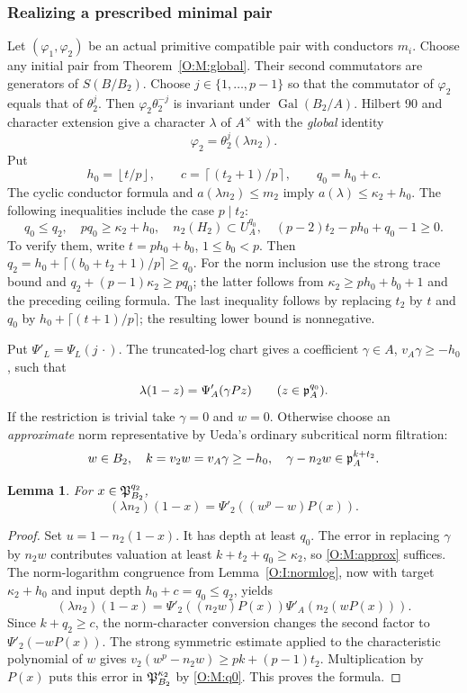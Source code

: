 \documentclass[11pt]{amsart}
\newtheorem{lemma}[theorem]{Lemma}
\theoremstyle{definition}
\theoremstyle{remark}
\newcommand{\Gal}{\operatorname{Gal}}
\newcommand{\ceil}[1]{\left\lceil #1\right\rceil}
\newcommand{\floor}[1]{\left\lfloor #1\right\rfloor}
\begin{document}
\subsubsection*{Realizing a prescribed minimal pair}
Let $(\varphi_1,\varphi_2)$ be an actual primitive compatible pair with
conductors $m_i$. Choose any initial pair from Theorem~\ref{O:M:global}.
Their second commutators are generators of $S(B/B_2)$. Choose
$j\in\{1,\ldots,p-1\}$ so that the commutator of $\varphi_2$ equals that of
$\theta_2^j$. Then $\varphi_2\theta_2^{-j}$ is invariant under
$\Gal(B_2/A)$. Hilbert 90 and character extension give a character $\lambda$
of $A^\times$ with the \emph{global} identity
\begin{equation}\label{O:M:actual2}
 \varphi_2=\theta_2^j(\lambda n_2).
\end{equation}
Put
\[
 h_0=\floor{t/p},\qquad c=\ceil{(t_2+1)/p},\qquad q_0=h_0+c.
\]
The cyclic conductor formula and $a(\lambda n_2)\le m_2$ imply
$a(\lambda)\le \kappa_2+h_0$.
The following inequalities include the case $p\mid t_2$:
\begin{equation}\label{O:M:q0}
 q_0\le q_2,\quad pq_0\ge \kappa_2+h_0,\quad
 n_2(H_2)\subset U_A^{q_0},\quad
 (p-2)t_2-ph_0+q_0-1\ge0.
\end{equation}
To verify them, write $t=ph_0+b_0$, $1\le b_0<p$.
Then $q_2=h_0+\lceil(b_0+t_2+1)/p\rceil\ge q_0$.
For the norm inclusion use the strong trace bound and
$q_2+(p-1)\kappa_2\ge pq_0$; the latter follows from
$\kappa_2\ge ph_0+b_0+1$ and the preceding ceiling formula.
The last inequality follows by replacing $t_2$ by $t$ and $q_0$ by
$h_0+\lceil(t+1)/p\rceil$; the resulting lower bound is nonnegative.

Put $\Psi'_L=\Psi_L(j\,\cdot)$. The truncated-log chart gives a coefficient
$\gamma\in A$, $v_A\gamma\ge-h_0$, such that
\[
 \lambda(1-z)=\Psi'_A(\gamma Pz)\qquad(z\in\mathfrak p_A^{q_0}).
\]
If the restriction is trivial take $\gamma=0$ and $w=0$.
Otherwise choose an \emph{approximate} norm representative by Ueda's
ordinary subcritical norm filtration:
\begin{equation}\label{O:M:approx}
 w\in B_2,\quad k=v_2w=v_A\gamma\ge-h_0,\quad
 \gamma-n_2w\in\mathfrak p_A^{k+t_2}.
\end{equation}

\begin{lemma}\label{O:M:lambdaformula}
For $x\in\mathfrak P_{B_2}^{q_2}$,
\[
 (\lambda n_2)(1-x)=\Psi'_2((w^p-w)P(x)).
\]
\end{lemma}
\begin{proof}
Set $u=1-n_2(1-x)$. It has depth at least $q_0$.
The error in replacing $\gamma$ by $n_2w$ contributes valuation at least
$k+t_2+q_0\ge \kappa_2$, so \eqref{O:M:approx} suffices.
The norm-logarithm congruence from Lemma~\ref{O:I:normlog}, now with target $\kappa_2+h_0$ and
input depth $h_0+c=q_0\le q_2$, yields
\[
 (\lambda n_2)(1-x)
 =\Psi'_2((n_2w)P(x))\Psi'_A(n_2(wP(x))).
\]
Since $k+q_2\ge c$, the norm-character conversion changes the second
factor to $\Psi'_2(-wP(x))$.
The strong symmetric estimate applied to the characteristic polynomial of
$w$ gives $v_2(w^p-n_2w)\ge pk+(p-1)t_2$. Multiplication by $P(x)$
puts this error in $\mathfrak P_{B_2}^{\kappa_2}$ by \eqref{O:M:q0}. This proves the formula.
\end{proof}
\end{document}
